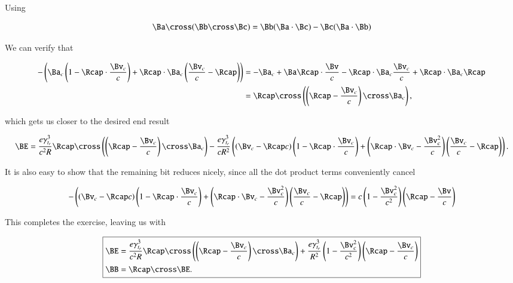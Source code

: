 Using

\begin{equation}\label{eqn:relElectroDynProblemSet5:510}
\Ba \cross (\Bb \cross \Bc) = \Bb (\Ba \cdot \Bc) - \Bc (\Ba \cdot \Bb)
\end{equation}

We can verify that

\begin{align*}
- \left( 
\Ba_c
\left(
1 -\Rcap \cdot \frac{\Bv_c}{c} 
\right)
+\Rcap \cdot \Ba_c \left( \frac{\Bv_c}{c} - \Rcap \right)
\right) 
&=
-\Ba_c + \Ba \Rcap \cdot \frac{\Bv}{c} - \Rcap \cdot \Ba_c \frac{\Bv_c}{c} + \Rcap \cdot \Ba_c \Rcap \\
&= \Rcap \cross \left( \left(\Rcap - \frac{\Bv_c}{c} \right) \cross \Ba_c \right),
\end{align*}

which gets us closer to the desired end result

\begin{equation}\label{eqn:relElectroDynProblemSet5:530}
\BE
= 
\frac{e \gamma_{t_r}^3}{c^2 R} \Rcap \cross \left( \left(\Rcap - \frac{\Bv_c}{c} \right) \cross \Ba_c \right)
- \frac{e \gamma_{t_r}^3}{c R^2} \left( 
\left(
\Bv_c
- \Rcap c
\right) 
\left(
1 -\Rcap \cdot \frac{\Bv_c}{c} 
\right)
+ \left( \Rcap \cdot \Bv_c - \frac{\Bv_c^2}{c} \right)
\left( \frac{\Bv_c}{c} - \Rcap \right)
\right).
\end{equation}

It is also easy to show that the remaining bit reduces nicely, since all the dot product terms conveniently cancel

\begin{equation}\label{eqn:relElectroDynProblemSet5:550}
- \left( 
\left(
\Bv_c
- \Rcap c
\right) 
\left(
1 -\Rcap \cdot \frac{\Bv_c}{c} 
\right)
+ \left( \Rcap \cdot \Bv_c - \frac{\Bv_c^2}{c} \right)
\left( \frac{\Bv_c}{c} - \Rcap \right)
\right) 
= 
c 
\left( 1 - \frac{\Bv_c^2}{c^2} \right) 
\left( \Rcap - \frac{\Bv}{c} \right)
\end{equation}

This completes the exercise, leaving us with

\begin{equation}\label{eqn:relElectroDynProblemSet5:570}
\boxed{
\begin{aligned}
\BE
&= 
\frac{e \gamma_{t_r}^3}{c^2 R} \Rcap \cross \left( \left(\Rcap - \frac{\Bv_c}{c} \right) \cross \Ba_c \right)
+\frac{e \gamma_{t_r}^3}{R^2} 
\left( 1 - \frac{\Bv_c^2}{c^2} \right) 
\left( \Rcap - \frac{\Bv_c}{c} \right) \\
\BB &= \Rcap \cross \BE.
\end{aligned}
}
\end{equation}

